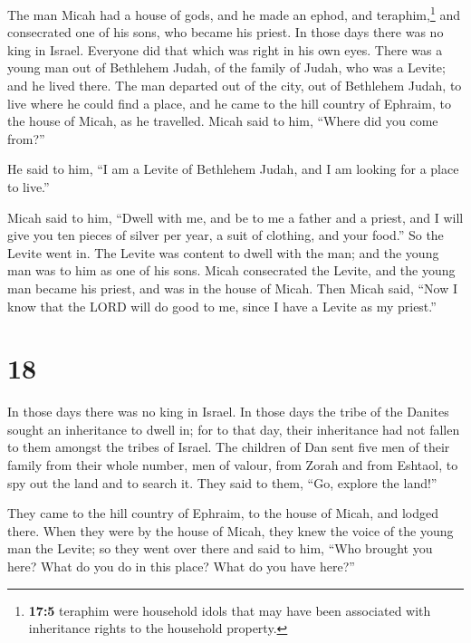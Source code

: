  The man Micah had a house of gods, and he made an ephod,
and teraphim,\footnote{\textbf{17:5} teraphim were household idols that
  may have been associated with inheritance rights to the household
  property.} and consecrated one of his sons, who became his priest.
 In those days there was no king in Israel. Everyone did
that which was right in his own eyes.  There was a young
man out of Bethlehem Judah, of the family of Judah, who was a Levite;
and he lived there.  The man departed out of the city, out
of Bethlehem Judah, to live where he could find a place, and he came to
the hill country of Ephraim, to the house of Micah, as he travelled.
 Micah said to him, ``Where did you come from?''

He said to him, ``I am a Levite of Bethlehem Judah, and I am looking for
a place to live.''

 Micah said to him, ``Dwell with me, and be to me a
father and a priest, and I will give you ten pieces of silver per year,
a suit of clothing, and your food.'' So the Levite went in.
 The Levite was content to dwell with the man; and the
young man was to him as one of his sons.  Micah
consecrated the Levite, and the young man became his priest, and was in
the house of Micah.  Then Micah said, ``Now I know that
the LORD will do good to me, since I have a Levite as my priest.''

\hypertarget{section-17}{%
\section{18}\label{section-17}}

 In those days there was no king in Israel. In those days
the tribe of the Danites sought an inheritance to dwell in; for to that
day, their inheritance had not fallen to them amongst the tribes of
Israel.  The children of Dan sent five men of their family
from their whole number, men of valour, from Zorah and from Eshtaol, to
spy out the land and to search it. They said to them, ``Go, explore the
land!''

They came to the hill country of Ephraim, to the house of Micah, and
lodged there.  When they were by the house of Micah, they
knew the voice of the young man the Levite; so they went over there and
said to him, ``Who brought you here? What do you do in this place? What
do you have here?''

